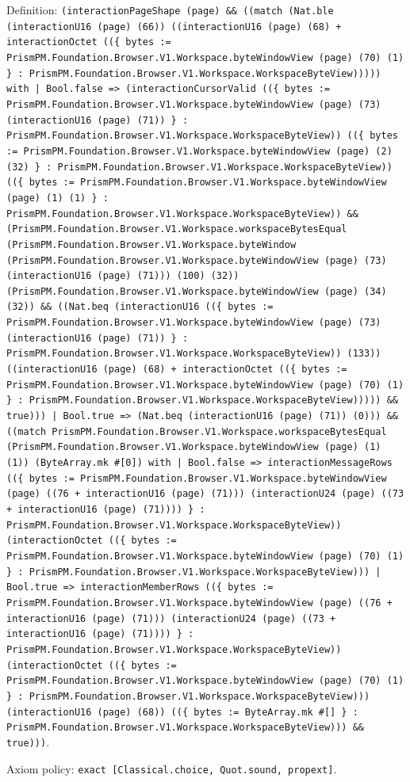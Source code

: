 \documentclass[11pt]{article}
\begin{document}
\noindent Definition: \texttt{(interactionPageShape (page) \&\& ((match (Nat.ble (interactionU16 (page) (66)) ((interactionU16 (page) (68) + interactionOctet ((\{ bytes := PrismPM.Foundation.Browser.V1.Workspace.byteWindowView (page) (70) (1) \} : PrismPM.Foundation.Browser.V1.Workspace.WorkspaceByteView))))) with | Bool.false => (interactionCursorValid ((\{ bytes := PrismPM.Foundation.Browser.V1.Workspace.byteWindowView (page) (73) (interactionU16 (page) (71)) \} : PrismPM.Foundation.Browser.V1.Workspace.WorkspaceByteView)) ((\{ bytes := PrismPM.Foundation.Browser.V1.Workspace.byteWindowView (page) (2) (32) \} : PrismPM.Foundation.Browser.V1.Workspace.WorkspaceByteView)) ((\{ bytes := PrismPM.Foundation.Browser.V1.Workspace.byteWindowView (page) (1) (1) \} : PrismPM.Foundation.Browser.V1.Workspace.WorkspaceByteView)) \&\& (PrismPM.Foundation.Browser.V1.Workspace.workspaceBytesEqual (PrismPM.Foundation.Browser.V1.Workspace.byteWindow (PrismPM.Foundation.Browser.V1.Workspace.byteWindowView (page) (73) (interactionU16 (page) (71))) (100) (32)) (PrismPM.Foundation.Browser.V1.Workspace.byteWindowView (page) (34) (32)) \&\& ((Nat.beq (interactionU16 ((\{ bytes := PrismPM.Foundation.Browser.V1.Workspace.byteWindowView (page) (73) (interactionU16 (page) (71)) \} : PrismPM.Foundation.Browser.V1.Workspace.WorkspaceByteView)) (133)) ((interactionU16 (page) (68) + interactionOctet ((\{ bytes := PrismPM.Foundation.Browser.V1.Workspace.byteWindowView (page) (70) (1) \} : PrismPM.Foundation.Browser.V1.Workspace.WorkspaceByteView))))) \&\& true))) | Bool.true => (Nat.beq (interactionU16 (page) (71)) (0))) \&\& ((match PrismPM.Foundation.Browser.V1.Workspace.workspaceBytesEqual (PrismPM.Foundation.Browser.V1.Workspace.byteWindowView (page) (1) (1)) (ByteArray.mk \#[0]) with | Bool.false => interactionMessageRows ((\{ bytes := PrismPM.Foundation.Browser.V1.Workspace.byteWindowView (page) ((76 + interactionU16 (page) (71))) (interactionU24 (page) ((73 + interactionU16 (page) (71)))) \} : PrismPM.Foundation.Browser.V1.Workspace.WorkspaceByteView)) (interactionOctet ((\{ bytes := PrismPM.Foundation.Browser.V1.Workspace.byteWindowView (page) (70) (1) \} : PrismPM.Foundation.Browser.V1.Workspace.WorkspaceByteView))) | Bool.true => interactionMemberRows ((\{ bytes := PrismPM.Foundation.Browser.V1.Workspace.byteWindowView (page) ((76 + interactionU16 (page) (71))) (interactionU24 (page) ((73 + interactionU16 (page) (71)))) \} : PrismPM.Foundation.Browser.V1.Workspace.WorkspaceByteView)) (interactionOctet ((\{ bytes := PrismPM.Foundation.Browser.V1.Workspace.byteWindowView (page) (70) (1) \} : PrismPM.Foundation.Browser.V1.Workspace.WorkspaceByteView))) (interactionU16 (page) (68)) ((\{ bytes := ByteArray.mk \#[] \} : PrismPM.Foundation.Browser.V1.Workspace.WorkspaceByteView))) \&\& true)))}.\par
\noindent Axiom policy: \texttt{exact [Classical.choice, Quot.sound, propext]}.\par
\end{document}
